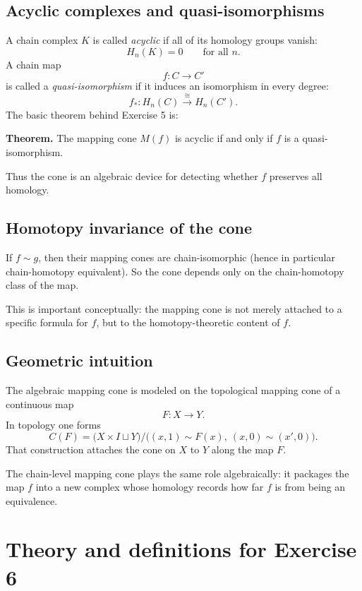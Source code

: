 \documentclass[12pt,a4paper]{article}
\theoremstyle{notespace}
\begin{document}
\subsection{Acyclic complexes and quasi-isomorphisms}

A chain complex \(K\) is called \emph{acyclic} if all of its homology groups vanish:
\[
H_n(K)=0
\qquad\text{for all }n.
\]
A chain map
\[
f:C\to C'
\]
is called a \emph{quasi-isomorphism} if it induces an isomorphism in every degree:
\[
f_*:H_n(C)\xrightarrow{\cong} H_n(C').
\]
The basic theorem behind Exercise 5 is:

\medskip
\noindent
\textbf{Theorem.}
The mapping cone \(M(f)\) is acyclic if and only if \(f\) is a quasi-isomorphism.

\medskip
Thus the cone is an algebraic device for detecting whether \(f\) preserves all homology.

\subsection{Homotopy invariance of the cone}

If \(f\sim g\), then their mapping cones are chain-isomorphic (hence in particular chain-homotopy equivalent). So the cone depends only on the chain-homotopy class of the map.

This is important conceptually: the mapping cone is not merely attached to a specific formula for \(f\), but to the homotopy-theoretic content of \(f\).

\subsection{Geometric intuition}

The algebraic mapping cone is modeled on the topological mapping cone of a continuous map
\[
F:X\to Y.
\]
In topology one forms
\[
C(F)=\bigl(X\times I \sqcup Y\bigr)\big/\bigl((x,1)\sim F(x),\ (x,0)\sim (x',0)\bigr).
\]
That construction attaches the cone on \(X\) to \(Y\) along the map \(F\).

The chain-level mapping cone plays the same role algebraically: it packages the map \(f\) into a new complex whose homology records how far \(f\) is from being an equivalence.

\bigskip

\section{Theory and definitions for Exercise 6}
\end{document}
